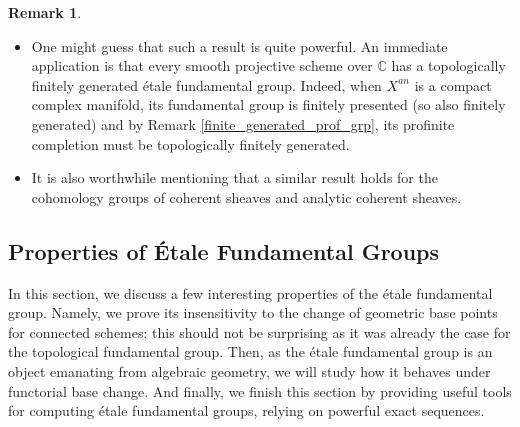 \documentclass{article}
\theoremstyle{plain}
\theoremstyle{definition}
\newtheorem{remark}{Remark}
\begin{document}
\begin{remark}\textbf{ }
\label{etale_fund_grp_fin_gen}
\begin{itemize}
    \item[$a)$] One might guess that such a result is quite powerful.
    An immediate application is that every smooth projective scheme over $\mathbb{C}$ has a topologically finitely generated \'etale fundamental group.
    Indeed, when $X^{an}$ is a compact complex manifold, its fundamental group is finitely presented (so also finitely generated) and by Remark \ref{finite_generated_prof_grp}, its profinite completion must be topologically finitely generated.
    \item[$b)$] It is also worthwhile mentioning that a similar result holds for the cohomology groups of coherent sheaves and analytic coherent sheaves. 
\end{itemize}
    
\end{remark}






\subsection{Properties of \'Etale Fundamental Groups}
In this section, we discuss a few interesting properties of the \'etale fundamental group. 
Namely, we prove its insensitivity to the change of geometric base points for connected schemes; this should not be surprising as it was already the case for the topological fundamental group.
Then, as the \'etale fundamental group is an object emanating from algebraic geometry, we will study how it behaves under functorial base change.
And finally, we finish this section by providing useful tools for computing \'etale fundamental groups, relying on powerful exact sequences.\\
\end{document}
